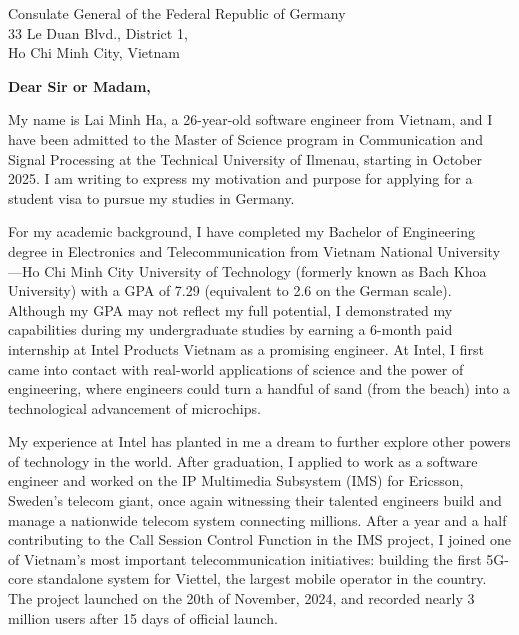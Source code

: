 \documentclass[a4paper,11pt]{letter}
\date{}
\begin{document}
\begin{letter}{
    Consulate General of the Federal Republic of Germany
    \\ 33 Le Duan Blvd., District 1,
    \\ Ho Chi Minh City, Vietnam
}



\opening{\textbf{Dear Sir or Madam,}}

My name is Lai Minh Ha, a 26-year-old software engineer from Vietnam, and I have been admitted to the Master of Science program in Communication and Signal Processing at the Technical University of Ilmenau, starting in October 2025. I am writing to express my motivation and purpose for applying for a student visa to pursue my studies in Germany.

For my academic background, I have completed my Bachelor of Engineering degree in Electronics and Telecommunication from Vietnam National University—Ho Chi Minh City University of Technology (formerly known as Bach Khoa University) with a GPA of 7.29 (equivalent to 2.6 on the German scale). Although my GPA may not reflect my full potential, I demonstrated my capabilities during my undergraduate studies by earning a 6-month paid internship at Intel Products Vietnam as a promising engineer. At Intel, I first came into contact with real-world applications of science and the power of engineering, where engineers could turn a handful of sand (from the beach) into a technological advancement of microchips.

My experience at Intel has planted in me a dream to further explore other powers of technology in the world. After graduation, I applied to work as a software engineer and worked on the IP Multimedia Subsystem (IMS) for Ericsson, Sweden's telecom giant, once again witnessing their talented engineers build and manage a nationwide telecom system connecting millions. After a year and a half contributing to the Call Session Control Function in the IMS project, I joined one of Vietnam’s most important telecommunication initiatives: building the first 5G-core standalone system for Viettel, the largest mobile operator in the country. The project launched on the 20th of November, 2024, and recorded nearly 3 million users after 15 days of official launch.



\end{letter}
\end{document}
